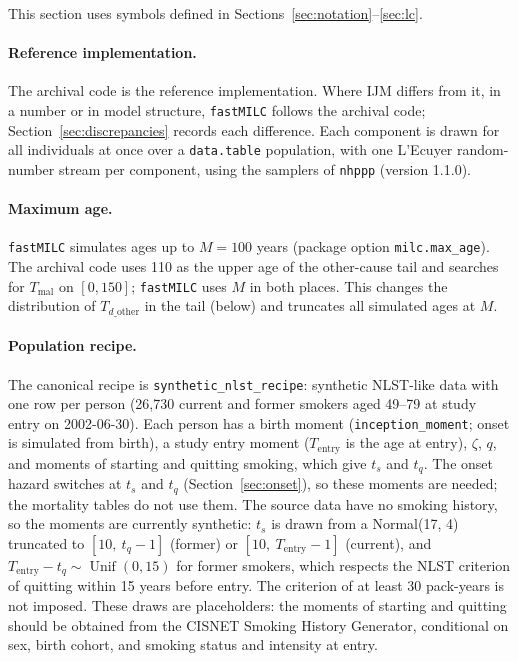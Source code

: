 \documentclass[11pt]{article}
\newcommand{\code}[1]{\texttt{#1}}
\newcommand{\Unif}{\operatorname{Unif}}
\newcommand{\Tentry}{T_{\mathrm{entry}}}
\newcommand{\Tmal}{T_{\mathrm{mal}}}
\newcommand{\Tdo}{T_{d\_\mathrm{other}}}
\begin{document}
This section uses symbols defined in Sections~\ref{sec:notation}--\ref{sec:lc}.

\paragraph{Reference implementation.} The archival code is the reference
implementation. Where IJM differs from it, in a number or in model structure,
\code{fastMILC} follows the archival code; Section~\ref{sec:discrepancies}
records each difference. Each component is drawn for all individuals at once
over a \code{data.table} population, with one L'Ecuyer random-number stream per
component, using the samplers of \code{nhppp} (version 1.1.0).

\paragraph{Maximum age.} \code{fastMILC} simulates ages up to $M=100$ years (package
option \code{milc.max\_age}). The archival code uses 110 as the upper age of the
other-cause tail and searches for $\Tmal$ on $[0,150]$; \code{fastMILC} uses $M$
in both places. This changes the distribution of $\Tdo$ in the tail (below) and
truncates all simulated ages at $M$.

\paragraph{Population recipe.} The canonical recipe is \code{synthetic\_nlst\_recipe}:
synthetic NLST-like data with one row per person (26{,}730 current and former
smokers aged 49--79 at study entry on 2002-06-30). Each person has a birth
moment (\code{inception\_moment}; onset is simulated from birth), a study
entry moment ($\Tentry$ is the age at entry), $\zeta$, $q$, and moments of
starting and quitting smoking, which give $t_s$ and $t_q$. The onset hazard
switches at $t_s$ and $t_q$ (Section~\ref{sec:onset}), so these moments are
needed; the mortality tables do not use them. The source data have no smoking
history, so the moments are currently synthetic: $t_s$ is drawn from a
Normal(17, 4) truncated to $[10,\ t_q - 1]$ (former) or $[10,\ \Tentry - 1]$
(current), and $\Tentry - t_q \sim \Unif(0, 15)$ for former smokers, which
respects the NLST criterion of quitting within 15 years before entry. The
criterion of at least 30 pack-years is not imposed. These draws are
placeholders: the moments of starting and quitting should be obtained from the
CISNET Smoking History Generator, conditional on sex, birth cohort, and
smoking status and intensity at entry.
\end{document}
